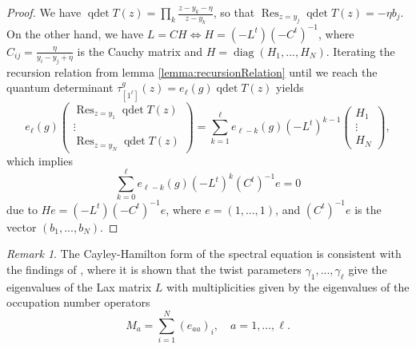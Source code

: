 \documentclass[11pt]{report}
\newtheorem{corollary}[theorem]{Corollary}
\theoremstyle{definition}
\theoremstyle{remark}
\newtheorem*{remark}{Remark}
\theoremstyle{remark}
\begin{document}
\begin{proof}
We have $\operatorname{qdet} T(z) = \prod_k \frac{z-y_k-\eta}{z-y_k}$, so that $\operatorname{Res}_{z=y_j} \operatorname{qdet} T(z) = -\eta b_j$. On the other hand, we have $L = CH \Leftrightarrow H = (-L^t) (-C^t)^{-1}$, where $C_{ij} = \frac{\eta}{y_i-y_j+\eta}$ is the Cauchy matrix and $H = \operatorname{diag}(H_1,...,H_N)$. Iterating the recursion relation from lemma \ref{lemma:recursionRelation} until we reach the quantum determinant $\tau_{[1^\ell]}^g(z) = e_\ell(g) \operatorname{qdet} T(z)$ yields
\begin{equation*}
e_\ell(g)
\begin{pmatrix}
\operatorname{Res}_{z=y_1} \operatorname{qdet} T(z) \\ \vdots \\ \operatorname{Res}_{z=y_N} \operatorname{qdet} T(z)
\end{pmatrix}
= \sum_{k=1}^\ell e_{\ell-k}(g) (-L^t)^{k-1}
\begin{pmatrix}
H_1 \\ \vdots \\ H_N
\end{pmatrix},
\end{equation*}
which implies
\begin{equation*}
\sum_{k=0}^\ell e_{\ell-k}(g) (-L^t)^k (C^t)^{-1} e = 0
\end{equation*}
due to $H e = (-L^t) (-C^t)^{-1} e$, where $e = (1,...,1)$, and $(C^t)^{-1} e$ is the vector $(b_1,...,b_N)$.
\end{proof}

\begin{remark}
The Cayley-Hamilton form of the spectral equation is consistent with the findings of \cite{article:gorsky:2014}, where it is shown that the twist parameters $\gamma_1,...,\gamma_\ell$ give the eigenvalues of the Lax matrix $L$ with multiplicities given by the eigenvalues of the occupation number operators
\begin{equation}\label{equation:occupationNumber}
M_a = \sum_{i=1}^N (e_{aa})_i, \quad a=1,...,\ell.
\end{equation}
\end{remark}

%
%
\end{document}
